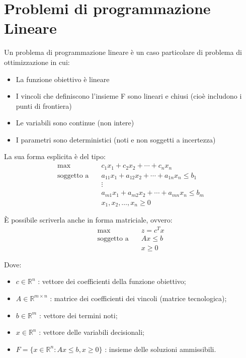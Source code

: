 \section{Problemi di programmazione Lineare}
Un problema di programmazione lineare è un caso particolare di problema di ottimizzazione in cui:

\begin{itemize}
    \item La funzione obiettivo è lineare
    \item I vincoli che definiscono l'insieme F sono lineari e chiusi (cioè includono i punti di frontiera)
    \item Le variabili sono continue (non intere)
    \item I parametri sono deterministici (noti e non soggetti a incertezza)
\end{itemize}

La sua forma esplicita è del tipo:
\begin{align}
\max & \quad c_1x_1 + c_2x_2 + \cdots + c_nx_n \\
\text{soggetto a} & \quad a_{11}x_1 + a_{12}x_2 + \cdots + a_{1n}x_n \leq b_1 \\
& \quad \vdots \\
& \quad a_{m1}x_1 + a_{m2}x_2 + \cdots + a_{mn}x_n \leq b_m \\
& \quad x_1, x_2, \ldots, x_n \geq 0
\end{align}

È possibile scriverla anche in forma matriciale, ovvero:
\begin{align}
\max & \quad z = c^T x \\
\text{soggetto a} & \quad Ax \leq b \\
& \quad x \geq 0
\end{align}

Dove:


\begin{itemize}
    \item $c \in \mathbb{R}^n$ : vettore dei coefficienti della funzione obiettivo;
    \item $A \in \mathbb{R}^{m \times n}$ : matrice dei coefficienti dei vincoli (matrice tecnologica);
    \item $b \in \mathbb{R}^m$ : vettore dei termini noti;
    \item $x \in \mathbb{R}^n$ : vettore delle variabili decisionali;
    \item $F = \{x \in \mathbb{R}^n : Ax \leq b, x \geq 0\}$ : insieme delle soluzioni ammissibili.
\end{itemize}

